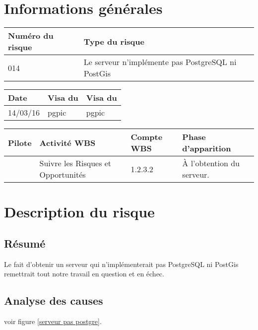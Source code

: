 
\section*{Informations générales}

\begin{table}[H]
\centering
	\begin{tabularx}{16.8cm}{|X|X|}
	\hline
	\rowcolor{gray!40} Numéro du risque & Type du risque \\
	\hline
	014 & Le serveur n’implémente pas PostgreSQL ni PostGis \\
	\hline
	\end{tabularx}
\end{table}

\begin{table}[H]
\centering
	\begin{tabularx}{16.8cm}{|X|X|X|}
	\hline
	\rowcolor{gray!40} Date & Visa du \RQ & Visa du \CP \\
	\hline
	 14/03/16 & pgpic & pgpic \\
	\hline
	\end{tabularx}
\end{table}

\begin{table}[H]
\centering
	\begin{tabularx}{16.8cm}{|X|X|X|X|}
	\hline
	\rowcolor{gray!40} Pilote & Activité WBS & Compte WBS & Phase d'apparition \\
	\hline
	 \Pierre & Suivre les Risques et Opportunités & 1.2.3.2 & À l'obtention du serveur. \\
	\hline
	\end{tabularx}
\end{table}

\section*{Description du risque}

\subsection*{Résumé}
	Le fait d'obtenir un serveur qui n’implémenterait pas PostgreSQL ni PostGis remettrait tout notre travail en question et en échec.
	
\subsection*{Analyse des causes}
	voir figure \ref{serveur pas postgre}.

